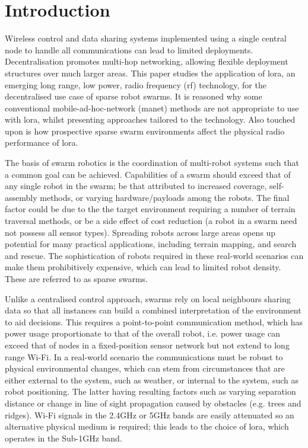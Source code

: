 \chapter{Introduction}
Wireless control and data sharing systems implemented using a single central node to handle all communications can lead to limited deployments. Decentralisation promotes multi-hop networking, allowing flexible deployment structures over much larger areas. This paper studies the application of \ac{lora}, an emerging long range, low power, radio frequency (\ac{rf}) technology, for the decentralised use case of sparse robot swarms. It is reasoned why some conventional mobile-ad-hoc-network (\ac{manet}) methods are not appropriate to use with \ac{lora}, whilst presenting approaches tailored to the technology. Also touched upon is how prospective sparse swarm environments affect the physical radio performance of \ac{lora}.

The basis of swarm robotics is the coordination of multi-robot systems such that a common goal can be achieved. Capabilities of a swarm should exceed that of any single robot in the swarm; be that attributed to increased coverage, self-assembly methods, or varying hardware/payloads among the robots. The final factor could be due to the the target environment requiring a number of terrain traversal methods, or be a side effect of cost reduction (a robot in a swarm need not possess all sensor types). Spreading robots across large areas opens up potential for many practical applications, including terrain mapping, and search and rescue. The sophistication of robots required in these real-world scenarios can make them prohibitively expensive, which can lead to limited robot density. These are referred to as sparse swarms.
 
Unlike a centralised control approach, swarms rely on local neighbours sharing  data so that all instances can build a combined interpretation of the environment to aid decisions. This requires a point-to-point communication method, which has power usage proportionate to that of the overall robot,  i.e. power usage can exceed that of nodes in a fixed-position sensor network but not extend to long range Wi-Fi. In a real-world scenario the communications must be robust to physical environmental changes, which can stem from circumstances that are either external to the system, such as weather, or internal to the system, such as robot positioning. The latter having resulting factors such as varying separation distance or change in line of sight propagation caused by obstacles (e.g. trees and ridges). Wi-Fi signals in the 2.4GHz or 5GHz bands are easily attenuated so an alternative physical medium is required; this leads to the choice of \ac{lora}, which operates in the Sub-1GHz band.   


